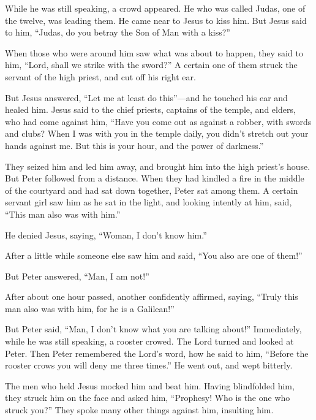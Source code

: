  While he was still speaking, a crowd appeared. He who
was called Judas, one of the twelve, was leading them. He came near to
Jesus to kiss him.  But Jesus said to him, ``Judas, do
you betray the Son of Man with a kiss?''

 When those who were around him saw what was about to
happen, they said to him, ``Lord, shall we strike with the sword?''
 A certain one of them struck the servant of the high
priest, and cut off his right ear.

 But Jesus answered, ``Let me at least do this''---and he
touched his ear and healed him.  Jesus said to the chief
priests, captains of the temple, and elders, who had come against him,
``Have you come out as against a robber, with swords and clubs?
 When I was with you in the temple daily, you didn't
stretch out your hands against me. But this is your hour, and the power
of darkness.''

 They seized him and led him away, and brought him into
the high priest's house. But Peter followed from a distance.
 When they had kindled a fire in the middle of the
courtyard and had sat down together, Peter sat among them.
 A certain servant girl saw him as he sat in the light,
and looking intently at him, said, ``This man also was with him.''

 He denied Jesus, saying, ``Woman, I don't know him.''

 After a little while someone else saw him and said,
``You also are one of them!''

But Peter answered, ``Man, I am not!''

 After about one hour passed, another confidently
affirmed, saying, ``Truly this man also was with him, for he is a
Galilean!''

 But Peter said, ``Man, I don't know what you are talking
about!'' Immediately, while he was still speaking, a rooster crowed.
 The Lord turned and looked at Peter. Then Peter
remembered the Lord's word, how he said to him, ``Before the rooster
crows you will deny me three times.''  He went out, and
wept bitterly.

 The men who held Jesus mocked him and beat him.
 Having blindfolded him, they struck him on the face and
asked him, ``Prophesy! Who is the one who struck you?'' 
They spoke many other things against him, insulting him.

